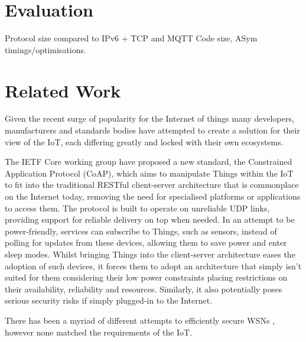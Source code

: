 \documentclass[conference]{./sty/IEEEtran}
\begin{document}
\section{Evaluation} %
\label{sec:evaluation}
Protocol size compared to IPv6 + TCP and MQTT
Code size, ASym timings/optimisations.

\section{Related Work} %
\label{sec:related_work}
Given the recent surge of popularity for the Internet of things many developers, manufacturers and standards bodies have attempted to create a solution for their view of the IoT, each differing greatly and locked with their own ecosystems. 

The IETF Core working group have proposed a new standard, the Constrained Application Protocol (CoAP)\cite{IETF_COAP_HTTP}, which aims to manipulate Things within the IoT to fit into the traditional RESTful client-server architecture that is commonplace on the Internet today, removing the need for specialised platforms or applications to access them. The protocol is built to operate on unreliable UDP links, providing support for reliable delivery on top when needed. In an attempt to be power-friendly, services can subscribe to Things, such as sensors, instead of polling for updates from these devices, allowing them to save power and enter sleep modes. Whilst bringing Things into the client-server architecture eases the adoption of such devices, it forces them to adopt an architecture that simply isn't suited for them considering their low power constraints placing restrictions on their availability, reliability and resources. Similarly, it also potentially poses serious security risks if simply plugged-in to the Internet\cite{BelkinWemo}.

There has been a myriad of different attempts to efficiently secure WSNs \cite{TinySec,MiniSec,TinyECC,TinyPK,TinyPBC,Shi2013235,ContikiSec,MessageBottle,CertificatePairwise,MizanurRahman2010858}, however none matched the requirements of the IoT.
\end{document}
